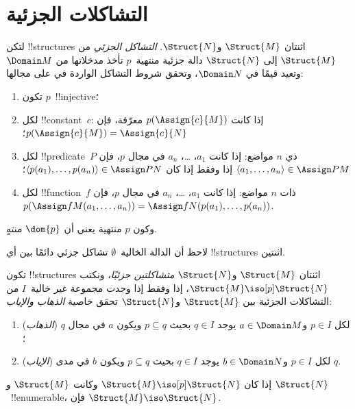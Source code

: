 \documentclass[../../../include/open-logic-section]{subfiles}
\begin{document}
\section{التشاكلات الجزئية}

\begin{defn}
  لتكن !!{structure}s اثنتان $\Struct{M}$ و$\Struct{N}$. \emph{التشاكل
  الجزئي} من $\Struct{M}$ إلى $\Struct{N}$ دالة جزئية منتهية~$p$ تأخذ
  مدخلاتها من $\Domain M$ وتعيد قيمًا في $\Domain N$، وتحقق شروط التشاكل
  الواردة في  على مجالها:
  \begin{enumerate}
  \item تكون $p$~!!{injective}؛
  \item لكل !!{constant}~$c$: إذا كانت $p(\Assign{c}{M})$ معرّفة، فإن
    $p(\Assign{c}{M}) = \Assign{c}{N}$؛
  \item لكل !!{predicate}~$P$ ذي $n$ مواضع: إذا كانت $a_1$، \dots،
    $a_n$ في مجال $p$، فإن $\langle a_1, \dots, a_n\rangle \in
    \Assign P M$ إذا وفقط إذا كان
    $\langle p(a_1), \dots, p(a_n) \rangle \in \Assign P N$؛
  \item لكل !!{function}~$f$ ذات $n$ مواضع: إذا كانت $a_1$، \dots،
    $a_n$ في مجال $p$، فإن $p(\Assign f M (a_1, \dots,a_n))
    = \Assign f N (p(a_1), \dots, p(a_n))$.
  \end{enumerate}
  وكون $p$ منتهية يعني أن $\dom{p}$ منتهٍ.
\end{defn}

لاحظ أن الدالة الخالية~$\emptyset$ تشاكل جزئي دائمًا بين أي
!!{structure}s اثنتين.

\begin{defn}
  تكون !!{structure}s اثنتان $\Struct{M}$ و$\Struct{N}$
  \emph{متشاكلتين جزئيًا}، ونكتب $\Struct{M} \iso[p] \Struct{N}$، إذا
  وفقط إذا وجدت مجموعة غير خالية~$I$ من التشاكلات الجزئية بين
  $\Struct{M}$ و$\Struct{N}$ تحقق خاصية \emph{الذهاب والإياب}:
  \begin{enumerate}
  \item (\emph{الذهاب}) لكل $p \in I$ و$a \in \Domain M$ يوجد
    $q \in I$ بحيث $p \subseteq q$ ويكون $a$ في مجال $q$؛
  \item (\emph{الإياب}) لكل $p \in I$ و$b \in \Domain N$ يوجد
    $q \in I$ بحيث $p \subseteq q$ ويكون $b$ في مدى $q$.
  \end{enumerate}
\end{defn}

\begin{thm}
  إذا كان $\Struct{M} \iso[p] \Struct{N}$ وكانت $\Struct{M}$ و
  $\Struct{N}$~!!{enumerable}، فإن $\Struct{M} \iso \Struct{N}$.
\end{thm}
\end{document}
